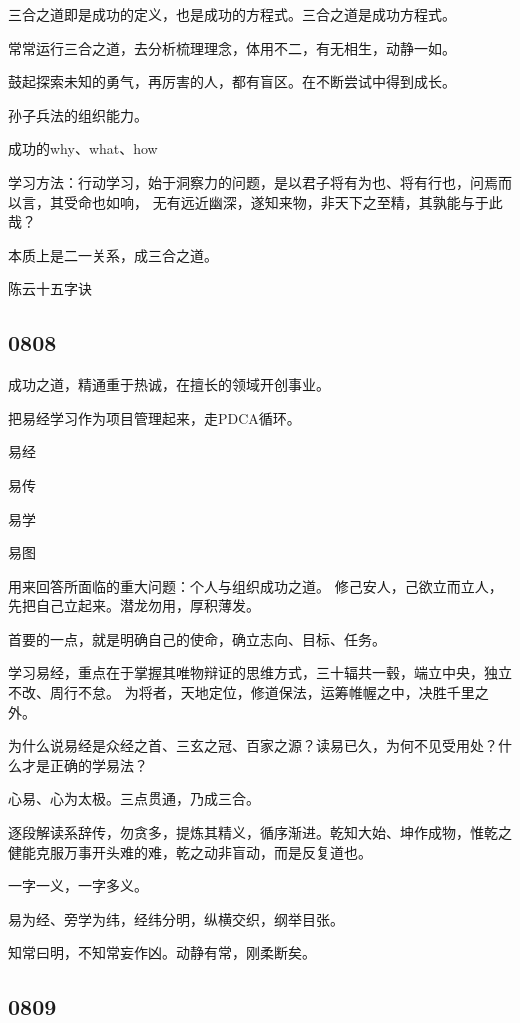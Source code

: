 三合之道即是成功的定义，也是成功的方程式。三合之道是成功方程式。

常常运行三合之道，去分析梳理理念，体用不二，有无相生，动静一如。

鼓起探索未知的勇气，再厉害的人，都有盲区。在不断尝试中得到成长。

孙子兵法的组织能力。

成功的why、what、how

学习方法：行动学习，始于洞察力的问题，是以君子将有为也、将有行也，问焉而以言，其受命也如响，
无有远近幽深，遂知来物，非天下之至精，其孰能与于此哉？

本质上是二一关系，成三合之道。

陈云十五字诀

\subsection{0808}

成功之道，精通重于热诚，在擅长的领域开创事业。

把易经学习作为项目管理起来，走PDCA循环。

\begin{enumbox}
\item 易经
\item 易传
\item 易学
\item 易图
\end{enumbox}

用来回答所面临的重大问题：个人与组织成功之道。
修己安人，己欲立而立人，先把自己立起来。潜龙勿用，厚积薄发。

首要的一点，就是明确自己的使命，确立志向、目标、任务。

学习易经，重点在于掌握其唯物辩证的思维方式，三十辐共一毂，端立中央，独立不改、周行不怠。
为将者，天地定位，修道保法，运筹帷幄之中，决胜千里之外。

为什么说易经是众经之首、三玄之冠、百家之源？读易已久，为何不见受用处？什么才是正确的学易法？

心易、心为太极。三点贯通，乃成三合。

逐段解读系辞传，勿贪多，提炼其精义，循序渐进。乾知大始、坤作成物，惟乾之健能克服万事开头难的难，乾之动非盲动，而是反复道也。

一字一义，一字多义。

易为经、旁学为纬，经纬分明，纵横交织，纲举目张。

知常曰明，不知常妄作凶。动静有常，刚柔断矣。

\subsection{0809}

